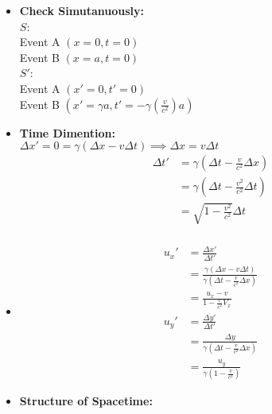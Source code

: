 \documentclass[fleqn,a4paper,12pt]{article}
\begin{document}
\begin{itemize}
  \item
    \textbf{Check Simutanuously:}\\
    $S$:\\
    Event A $(x = 0, t = 0 ) $\\
    Event B $(x = a, t = 0 ) $\\
    $S'$:\\
    Event A $(x' = 0, t' = 0 )$\\
    Event B $(x' = \gamma a , t' = -\gamma (\frac {v}{c^2}) a  )$\\
  \item
    \textbf{Time Dimention:}\\
    $\Delta x' = 0 = \gamma ( \Delta x - v \Delta t ) \implies \Delta x = v \Delta t$
    \begin{align*}
      \Delta t' &= \gamma ( \Delta t - \frac{v}{c^2} \Delta x ) \\
                &= \gamma ( \Delta t - \frac{v^2}{c^2} \Delta t ) \\
                &= \sqrt { 1 - \frac{v^2}{c^2} } \Delta t \\
    \end{align*}

  \item
    \begin{align*}
      {u_x}' &= \frac { \Delta x' }{ \Delta t' }\\
         &= \frac { \gamma (\Delta x - v \Delta t ) }{ \gamma ( \Delta t - \frac{v}{c^2} \Delta x ) }\\
         &= \frac { u_x -v }{ 1 - \frac {v}{c^2} V_x } \\
      {u_y}' &= \frac { \Delta y' }{ \Delta t' } \\
             &= \frac { \Delta y }{ \gamma ( \Delta t - \frac{ v }{ c^2 } \Delta x ) } \\
             &= \frac { u_y }{ \gamma( 1 - \frac{v}{c^2} ) }
    \end{align*}
    
  \item 
    \textbf{Structure of Spacetime: }


\end{itemize}
\end{document}

